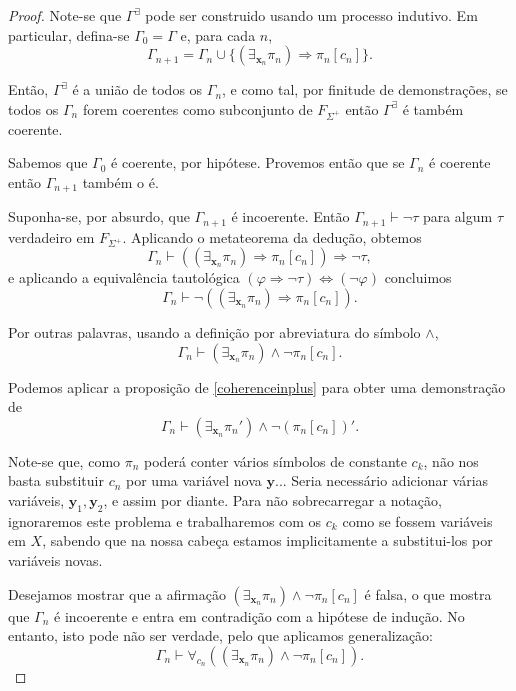 \documentclass{report}
\theoremstyle{definition}
\theoremstyle{remark}
\renewcommand{\bf}[1]{\mathbf{#1}}
\newcommand{\imply}{\mathbin{\Rightarrow}}
\newcommand{\eqv}{\mathbin{\Leftrightarrow}}
\begin{document}
	\begin{proof}
	Note-se que $\Gamma^\exists$ pode ser construido usando um processo indutivo. Em particular, defina-se $\Gamma_0 = \Gamma$ e, para cada $n$,
	\[\Gamma_{n+1} = \Gamma_n \cup \{(\exists_{\bf x_n} \pi_n) \imply \pi_n[c_n]\}.\]
	
	Então, $\Gamma^\exists$ é a união de todos os $\Gamma_n$, e como tal, por finitude de demonstrações, se todos os $\Gamma_n$ forem coerentes como subconjunto de $F_{\Sigma^+}$ então $\Gamma^\exists$ é também coerente.
	
	Sabemos que $\Gamma_0$ é coerente, por hipótese. Provemos então que se $\Gamma_n$ é coerente então $\Gamma_{n+1}$ também o é.
	
	Suponha-se, por absurdo, que $\Gamma_{n+1}$ é incoerente. Então $\Gamma_{n+1} \vdash \neg \tau$ para algum $\tau$ verdadeiro em $F_{\Sigma^+}$. Aplicando o metateorema da dedução, obtemos
	\[\Gamma_n \vdash ((\exists_{\bf x_n} \pi_n) \imply \pi_n[c_n]) \imply \neg \tau,\]
	e aplicando a equivalência tautológica $(\varphi \imply \neg \tau) \eqv (\neg \varphi)$ concluimos
	\[\Gamma_n \vdash \neg ((\exists_{\bf x_n} \pi_n) \imply \pi_n[c_n]).\]
	
	Por outras palavras, usando a definição por abreviatura do símbolo $\land$,
	\begin{equation}\label{eq:drinkersparadox}
\Gamma_n \vdash (\exists_{\bf x_n} \pi_n) \land \neg \pi_n[c_n].
	\end{equation}
	
	Podemos aplicar a proposição de \ref{coherenceinplus} para obter uma demonstração de
	\[\Gamma_n \vdash (\exists_{\bf x_n} \pi_n') \land \neg (\pi_n[c_n])'.\]
	
	Note-se que, como $\pi_n$ poderá conter vários símbolos de constante $c_k$, não nos basta substituir $c_n$ por uma variável nova $\bf y$... Seria necessário adicionar várias variáveis, $\bf y_1, \bf y_2$, e assim por diante. Para não sobrecarregar a notação, ignoraremos este problema e trabalharemos com os $c_k$ como se fossem variáveis em $X$, sabendo que na nossa cabeça estamos implicitamente a substitui-los por variáveis novas.

	Desejamos mostrar que a afirmação $(\exists_{\bf x_n} \pi_n) \land \neg \pi_n[c_n]$ é falsa, o que mostra que $\Gamma_n$ é incoerente e entra em contradição com a hipótese de indução. No entanto, isto pode não ser verdade, pelo que aplicamos generalização:
	\[\Gamma_n \vdash \forall_{c_n}((\exists_{\bf x_n} \pi_n) \land \neg \pi_n[c_n]).\]


\end{proof}
\end{document}
